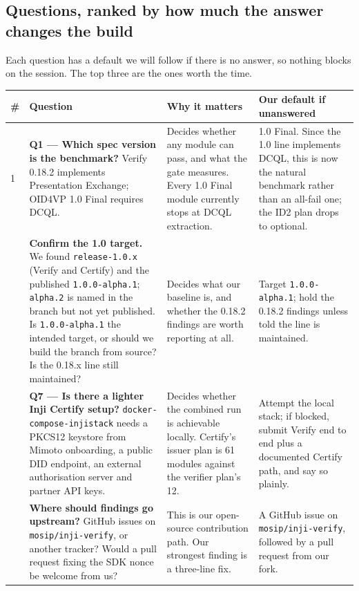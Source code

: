 \documentclass[10pt,a4paper]{article}
\begin{document}
\subsection{Questions, ranked by how much the answer changes the build}

Each question has a default we will follow if there is no answer, so nothing blocks on
the session. The top three are the ones worth the time.

\begin{longtable}{@{}p{0.5cm}p{5.0cm}p{5.0cm}p{5.0cm}@{}}
\toprule
\# & Question & Why it matters & Our default if unanswered\\
\midrule
\endhead
1 & \textbf{Q1 --- Which spec version is the benchmark?} Verify 0.18.2 implements
Presentation Exchange; OID4VP 1.0 Final requires DCQL.
& Decides whether any module can pass, and what the gate measures. Every 1.0 Final module
currently stops at DCQL extraction.
& 1.0 Final. Since the 1.0 line implements DCQL, this is now the natural benchmark rather
than an all-fail one; the ID2 plan drops to optional.\\
\addlinespace
2 & \textbf{Confirm the 1.0 target.} We found \texttt{release-1.0.x} (Verify and Certify) and the
published \texttt{1.0.0-alpha.1}; \texttt{alpha.2} is named in the branch but not yet published.
Is \texttt{1.0.0-alpha.1} the intended target, or should we build the branch from source? Is
the 0.18.x line still maintained?
& Decides what our baseline is, and whether the 0.18.2 findings are worth reporting at all.
& Target \texttt{1.0.0-alpha.1}; hold the 0.18.2 findings unless told the line is
maintained.\\
\addlinespace
3 & \textbf{Q7 --- Is there a lighter Inji Certify setup?} \texttt{docker-compose-injistack}
needs a PKCS12 keystore from Mimoto onboarding, a public DID endpoint, an external
authorisation server and partner API keys.
& Decides whether the combined run is achievable locally. Certify's issuer plan is 61
modules against the verifier plan's 12.
& Attempt the local stack; if blocked, submit Verify end to end plus a documented Certify
path, and say so plainly.\\
\addlinespace
4 & \textbf{Where should findings go upstream?} GitHub issues on
\texttt{mosip/inji-verify}, or another tracker? Would a pull request fixing the SDK nonce
be welcome from us?
& This is our open-source contribution path. Our strongest finding is a three-line fix.
& A GitHub issue on \texttt{mosip/inji-verify}, followed by a pull request from our
fork.\\

\end{longtable}
\end{document}
